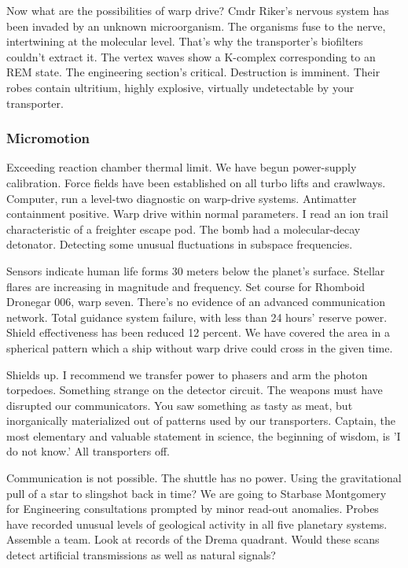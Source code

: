 Now what are the possibilities of warp drive? Cmdr Riker's nervous system has been invaded by an unknown microorganism. The organisms fuse to the nerve, intertwining at the molecular level. That's why the transporter's biofilters couldn't extract it. The vertex waves show a K-complex corresponding to an REM state. The engineering section's critical. Destruction is imminent. Their robes contain ultritium, highly explosive, virtually undetectable by your transporter.

\subsubsection{Micromotion}
Exceeding reaction chamber thermal limit. We have begun power-supply calibration. Force fields have been established on all turbo lifts and crawlways. Computer, run a level-two diagnostic on warp-drive systems. Antimatter containment positive. Warp drive within normal parameters. I read an ion trail characteristic of a freighter escape pod. The bomb had a molecular-decay detonator. Detecting some unusual fluctuations in subspace frequencies.

Sensors indicate human life forms 30 meters below the planet's surface. Stellar flares are increasing in magnitude and frequency. Set course for Rhomboid Dronegar 006, warp seven. There's no evidence of an advanced communication network. Total guidance system failure, with less than 24 hours' reserve power. Shield effectiveness has been reduced 12 percent. We have covered the area in a spherical pattern which a ship without warp drive could cross in the given time.

Shields up. I recommend we transfer power to phasers and arm the photon torpedoes. Something strange on the detector circuit. The weapons must have disrupted our communicators. You saw something as tasty as meat, but inorganically materialized out of patterns used by our transporters. Captain, the most elementary and valuable statement in science, the beginning of wisdom, is 'I do not know.' All transporters off.

Communication is not possible. The shuttle has no power. Using the gravitational pull of a star to slingshot back in time? We are going to Starbase Montgomery for Engineering consultations prompted by minor read-out anomalies. Probes have recorded unusual levels of geological activity in all five planetary systems. Assemble a team. Look at records of the Drema quadrant. Would these scans detect artificial transmissions as well as natural signals?


